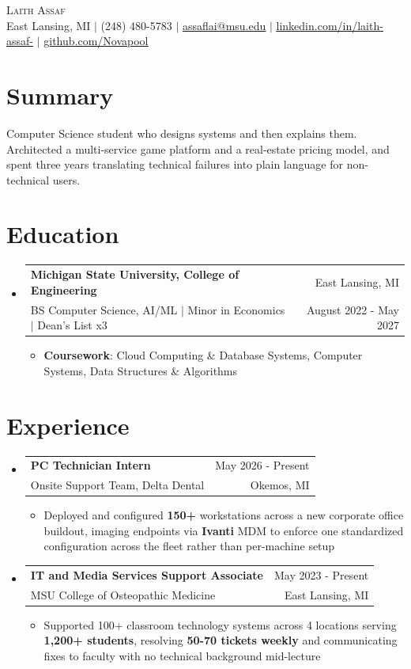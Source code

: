 \documentclass[letterpaper,11pt]{article}
\makeatletter
\newcommand{\resumeItem}[1]{
  \item\small{
    {#1 \vspace{-2pt}}
  }
}
\newcommand{\resumeSubheading}[4]{
  \vspace{-2pt}\item
    \begin{tabular*}{0.97\textwidth}[t]{l@{\extracolsep{\fill}}r}
      \textbf{#1} & \small #2 \\
      \small#3 & \small #4 \\
    \end{tabular*}\vspace{-7pt}
}
\newcommand{\resumeSubHeadingListStart}{\begin{itemize}[leftmargin=0.15in, label={}]}
\newcommand{\resumeSubHeadingListEnd}{\end{itemize}}
\newcommand{\resumeItemListStart}{\begin{itemize}}
\newcommand{\resumeItemListEnd}{\end{itemize}\vspace{-5pt}}
\makeatother
\begin{document}
\begin{center}
    {\Huge \scshape Laith Assaf} \\ \vspace{1pt}
    \small East Lansing, MI $|$ (248) 480-5783 $|$ \href{mailto:assaflai@msu.edu}{\underline{assaflai@msu.edu}} $|$ \href{https://linkedin.com/in/laith-assaf-}{\underline{linkedin.com/in/laith-assaf-}} $|$ \href{https://github.com/Novapool}{\underline{github.com/Novapool}}
\end{center}
\section{Summary}
 \begin{itemize}[leftmargin=0.15in, label={}]
    \small{\item{
    Computer Science student who designs systems and then explains them. Architected a multi-service game platform and a real-estate pricing model, and spent three years translating technical failures into plain language for non-technical users.
    }}
 \end{itemize}
\vspace{-6pt}

\section{Education}
  \resumeSubHeadingListStart
    \resumeSubheading
      {Michigan State University, College of Engineering}{East Lansing, MI}
      {BS Computer Science, AI/ML $|$ Minor in Economics $|$ Dean's List x3}{August 2022 - May 2027}
      \resumeItemListStart
        \resumeItem{\textbf{Coursework}: Cloud Computing \& Database Systems, Computer Systems, Data Structures \& Algorithms}
      \resumeItemListEnd
  \resumeSubHeadingListEnd

\section{Experience}
  \resumeSubHeadingListStart
    \resumeSubheading
      {PC Technician Intern}{May 2026 - Present}
      {Onsite Support Team, Delta Dental}{Okemos, MI}
      \resumeItemListStart
        \resumeItem{Deployed and configured \textbf{150+} workstations across a new corporate office buildout, imaging endpoints via \textbf{Ivanti} MDM to enforce one standardized configuration across the fleet rather than per-machine setup}
      \resumeItemListEnd
    \resumeSubheading
      {IT and Media Services Support Associate}{May 2023 - Present}
      {MSU College of Osteopathic Medicine}{East Lansing, MI}
      \resumeItemListStart
        \resumeItem{Supported 100+ classroom technology systems across 4 locations serving \textbf{1,200+ students}, resolving \textbf{50-70 tickets weekly} and communicating fixes to faculty with no technical background mid-lecture}
      \resumeItemListEnd
  \resumeSubHeadingListEnd
\end{document}
